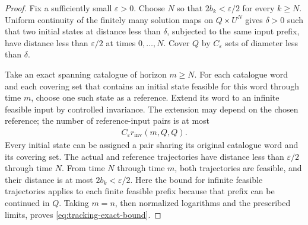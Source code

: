 \documentclass[11pt,a4paper]{article}
\theoremstyle{definition}
\theoremstyle{remark}
\begin{document}
\begin{proof}
Fix a sufficiently small \(\varepsilon>0\). Choose \(N\) so that \(2b_k<\varepsilon/2\) for every \(k\geq N\). Uniform continuity of the finitely many solution maps on \(Q\times U^N\) gives \(\delta>0\) such that two initial states at distance less than \(\delta\), subjected to the same input prefix, have distance less than \(\varepsilon/2\) at times \(0,\ldots,N\). Cover \(Q\) by \(C_\varepsilon\) sets of diameter less than \(\delta\).

Take an exact spanning catalogue of horizon \(m\geq N\). For each catalogue word and each covering set that contains an initial state feasible for this word through time \(m\), choose one such state as a reference. Extend its word to an infinite feasible input by controlled invariance. The extension may depend on the chosen reference; the number of reference-input pairs is at most
\begin{align}\label{eq:refinement-count}
 C_\varepsilon r_{\mathrm{inv}}(m,Q,Q).
\end{align}
Every initial state can be assigned a pair sharing its original catalogue word and its covering set. The actual and reference trajectories have distance less than \(\varepsilon/2\) through time \(N\). From time \(N\) through time \(m\), both trajectories are feasible, and their distance is at most \(2b_k<\varepsilon/2\). Here the bound for infinite feasible trajectories applies to each finite feasible prefix because that prefix can be continued in \(Q\). Taking \(m=n\), then normalized logarithms and the prescribed limits, proves \eqref{eq:tracking-exact-bound}.


\end{proof}
\end{document}
